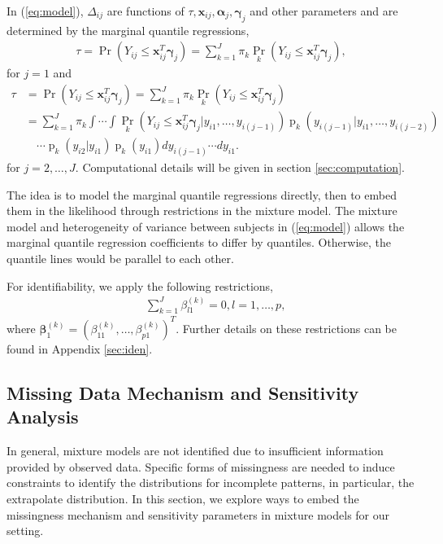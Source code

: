 \documentclass[12pt]{article}
\DeclareMathOperator{\pr}{p}
\DeclareMathOperator{\prob}{Pr}
\begin{document}
In (\ref{eq:model}), $\Delta_{ij}$ are functions of $\tau, \bm x_{ij},
\bm \alpha_j, \bm \gamma_j$ and other parameters and are determined by
the marginal quantile regressions,
\begin{align}
  \label{eq:deltaeqn1}
  \tau = \prob (Y_{ij} \leq \bm x_{ij}^T \bm \gamma_j ) = \sum_{k=1}^J
  \pi_k\prob_k (Y_{ij} \leq \bm x_{ij}^T \bm \gamma_j ),
\end{align}
for $j = 1$ and
\begin{align}\label{eq:deltaeqn2}
  \tau &= \prob (Y_{ij} \leq \bm x_{ij}^{T} \bm \gamma_j ) =
  \sum_{k=1}^J
  \pi_k\prob_k (Y_{ij} \leq \bm x_{ij}^{T} \bm \gamma_j ) \\
  & = \sum_{k=1}^J \pi_k \int\cdots \int \prob_k (Y_{ij} \leq \bm
  x_{ij}^{T} \bm \gamma_j |y_{i1},\ldots,
  y_{i(j-1)}) \pr_k (y_{i(j-1)}| y_{i1}, \ldots, y_{i(j-2)})  \nonumber \\
  & \quad \cdots \pr_k (y_{i2}| y_{i1}) \pr_k(y_{i1})
  dy_{i(j-1)}\cdots dy_{i1}. \nonumber
\end{align}
for $j = 2, \ldots, J$. Computational details will be given in
section \ref{sec:computation}.

The idea is to model the marginal quantile regressions directly, then
to embed them in the likelihood through restrictions in the mixture
model. The mixture model and heterogeneity of variance between
subjects in (\ref{eq:model}) allows the marginal quantile regression coefficients to
differ by quantiles. Otherwise, the quantile lines would be parallel
to each other.

For identifiability, we apply the following restrictions,
\begin{align*}
  & \sum_{k=1}^J \beta_{l1}^{(k)} = 0, l = 1,\ldots, p,
\end{align*}
where $\bm \beta_1^{(k)} = (\beta_{11}^{(k)}, \ldots,
\beta_{p1}^{(k)})^{T}$. Further details on these restrictions can be
found in Appendix \ref{sec:iden}.

\subsection{Missing Data Mechanism and Sensitivity Analysis}
\label{sec:sa}

In general, mixture models are not identified due to insufficient
information provided by observed data. Specific forms of missingness
are needed to induce constraints to identify the distributions for
incomplete patterns, in particular, the extrapolate distribution. In
this section, we explore ways to embed the missingness mechanism and
sensitivity parameters in mixture models for our setting.
\end{document}
